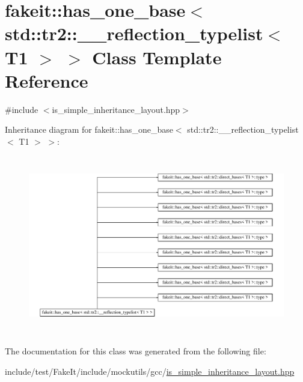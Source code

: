 \hypertarget{classfakeit_1_1has__one__base_3_01std_1_1tr2_1_1____reflection__typelist_3_01T1_01_4_01_4}{}\section{fakeit\+::has\+\_\+one\+\_\+base$<$ std\+::tr2\+::\+\_\+\+\_\+reflection\+\_\+typelist$<$ T1 $>$ $>$ Class Template Reference}
\label{classfakeit_1_1has__one__base_3_01std_1_1tr2_1_1____reflection__typelist_3_01T1_01_4_01_4}


{\ttfamily \#include $<$is\+\_\+simple\+\_\+inheritance\+\_\+layout.\+hpp$>$}

Inheritance diagram for fakeit\+::has\+\_\+one\+\_\+base$<$ std\+::tr2\+::\+\_\+\+\_\+reflection\+\_\+typelist$<$ T1 $>$ $>$\+:\begin{figure}[H]
\begin{center}
\leavevmode
\includegraphics[height=7.865169cm]{classfakeit_1_1has__one__base_3_01std_1_1tr2_1_1____reflection__typelist_3_01T1_01_4_01_4}
\end{center}
\end{figure}


The documentation for this class was generated from the following file\+:\begin{DoxyCompactItemize}
\item 
include/test/\+Fake\+It/include/mockutils/gcc/\mbox{\hyperlink{is__simple__inheritance__layout_8hpp}{is\+\_\+simple\+\_\+inheritance\+\_\+layout.\+hpp}}\end{DoxyCompactItemize}
